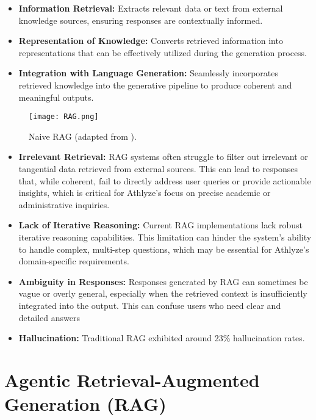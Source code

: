 \documentclass[conference]{IEEEtran}
\begin{document}
\begin{itemize}
\item \textbf{Information Retrieval:} Extracts relevant data or text from external knowledge sources, ensuring responses are contextually informed.
\item \textbf{Representation of Knowledge:} Converts retrieved information into representations that can be effectively utilized during the generation process.
\item \textbf{Integration with Language Generation:} Seamlessly incorporates retrieved knowledge into the generative pipeline to produce coherent and meaningful outputs.\\
\end{itemize}

\begin{figure}[h!]
    \centering
    \texttt{[image: RAG.png]}
    \caption{Naive RAG (adapted from \cite{12}).}
    \label{fig:RAG}
\end{figure}


\begin{itemize}
\item \textbf{Irrelevant Retrieval:} RAG systems often struggle to filter out irrelevant or tangential data retrieved from external sources. This can lead to responses that, while coherent, fail to directly address user queries or provide actionable insights, which is critical for Athlyze's focus on precise academic or administrative inquiries.
\item \textbf{Lack of Iterative Reasoning:} Current RAG implementations lack robust iterative reasoning capabilities. This limitation can hinder the system's ability to handle complex, multi-step questions, which may be essential for Athlyze's domain-specific requirements.
\item \textbf{Ambiguity in Responses:} Responses generated by RAG can sometimes be vague or overly general, especially when the retrieved context is insufficiently integrated into the output. This can confuse users who need clear and detailed answers
\item \textbf{Hallucination:} Traditional RAG exhibited around 23\% hallucination rates.\\

\end{itemize}

\section{Agentic Retrieval-Augmented Generation (RAG)}
\end{document}
